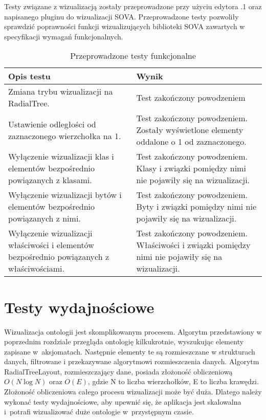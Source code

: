 Testy związane z wizualizacją zostały przeprowadzone przy użyciu edytora .1 oraz napisanego pluginu do wizualizacji SOVA. Przeprowadzone 
testy pozwoliły sprawdzić poprawności funkcji wizualizujących biblioteki SOVA zawartych w specyfikacji wymagań funkcjonalnych. 


\begin{longtable}{|m{7cm}|m{7cm}|} 
\caption{Przeprowadzone testy funkcjonalne}
\label{t:funk:wiz} \\
\hline
\bf{Opis testu} 	&  \bf{Wynik} \\ \hline

Zmiana trybu wizualizacji na RadialTree. 
& Test zakończony powodzeniem 
\\ \hline

Ustawienie odległości od zaznaczonego wierzchołka na 1. 
& Test zakończony powodzeniem. Zostały wyświetlone elementy oddalone o 1 od zaznaczonego.
\\ \hline

Wyłączenie wizualizacji klas i elementów bezpośrednio powiązanych z klasami. 
& Test zakończony powodzeniem. Klasy i związki pomiędzy nimi nie pojawiły się na wizualizacji.
\\ \hline


Wyłączenie wizualizacji bytów i elementów bezpośrednio powiązanych z nimi. 
& Test zakończony powodzeniem. Byty i związki pomiędzy nimi nie pojawiły się na wizualizacji.
\\ \hline


Wyłączenie wizualizacji właściwości i elementów bezpośrednio powiązanych z właściwościami. 
& Test zakończony powodzeniem. Właściwości i związki pomiędzy nimi nie pojawiły się na wizualizacji.
\\ \hline

\end{longtable}
\section{Testy wydajnościowe}
Wizualizacja ontologii jest skomplikowanym procesem. Algorytm przedstawiony w poprzednim rozdziale przegląda ontologię kilkukrotnie, wyszukując elementy 
zapisane w~aksjomatach. Następnie elementy te są  rozmieszczane w strukturach danych, filtrowane i przekazywane algorytmowi rozmieszczenia danych. Algorytm 
RadialTreeLayout, rozmieszczający dane, posiada złożoność obliczeniową $O(N\log N)$ oraz $O(E) $, gdzie N to liczba wierzchołków, E to liczba krawędzi. Złożoność obliczeniowa całego procesu
 wizualizacji może być duża. Dlatego należy wykonać testy wydajnościowe, aby upewnić się, że aplikacja jest skalowalna i~potrafi wizualizować duże ontologie w~przystępnym 
czasie. 

